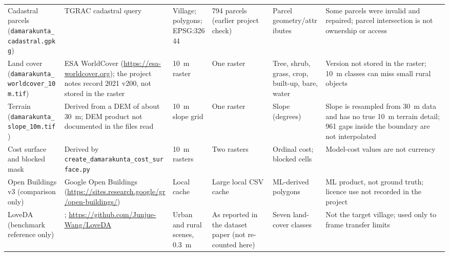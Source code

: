 \documentclass[12pt,a4paper]{report}
\begin{document}
\begin{landscape}
\begin{longtable}{@{}L{3.0cm}L{4.2cm}L{3.6cm}L{3.2cm}L{3.2cm}L{4.4cm}@{}}
Cadastral parcels (\texttt{damarakunta\_cadastral.gpkg}) & TGRAC cadastral query & Village; polygons; EPSG:32644 & 794 parcels (earlier project check) & Parcel geometry/attributes & Some parcels were invalid and repaired; parcel intersection is not ownership or access\\
Land cover (\texttt{damarakunta\_worldcover\_10m.tif}) & ESA WorldCover (\url{https://esa-worldcover.org}); the project notes record 2021 v200, not stored in the raster & 10~m raster & One raster & Tree, shrub, grass, crop, built-up, bare, water & Version not stored in the raster; 10~m classes can miss small rural objects\\
Terrain (\texttt{damarakunta\_slope\_10m.tif}) & Derived from a DEM of about 30~m; DEM product not documented in the files read & 10~m slope grid & One raster & Slope (degrees) & Slope is resampled from 30~m data and has no true 10~m terrain detail; 961 gaps inside the boundary are not interpolated\\
Cost surface and blocked mask & Derived by \texttt{create\_damarakunta\_cost\_surface.py} & 10~m rasters & Two rasters & Ordinal cost; blocked cells & Model-cost values are not currency\\
Open Buildings v3 (comparison only) & Google Open Buildings (\url{https://sites.research.google/gr/open-buildings/}) & Local cache & Large local CSV cache & ML-derived polygons & ML product, not ground truth; licence use not recorded in the project\\
LoveDA (benchmark reference only) & \cite{F05}; \url{https://github.com/Junjue-Wang/LoveDA} & Urban and rural scenes, 0.3~m & As reported in the dataset paper (not re-counted here) & Seven land-cover classes & Not the target village; used only to frame transfer limits\\
\end{longtable}
\end{landscape}
\end{document}
